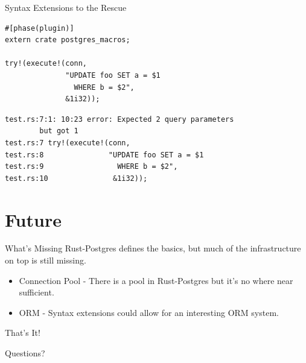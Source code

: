 \documentclass{beamer}
\begin{document}
\begin{frame}[fragile]{Syntax Extensions to the Rescue}
    \begin{verbatim}
#[phase(plugin)]
extern crate postgres_macros;

try!(execute!(conn,
              "UPDATE foo SET a = $1
                WHERE b = $2",
              &1i32));
    \end{verbatim}
    \begin{verbatim}
test.rs:7:1: 10:23 error: Expected 2 query parameters
        but got 1
test.rs:7 try!(execute!(conn,
test.rs:8               "UPDATE foo SET a = $1
test.rs:9                 WHERE b = $2",
test.rs:10               &1i32));
    \end{verbatim}
\end{frame}

\section{Future}

\begin{frame}{What's Missing}
    Rust-Postgres defines the basics, but much of the infrastructure on top
    is still missing.
    \begin{itemize}
        \item Connection Pool - There is a pool in Rust-Postgres but it's no
        where near sufficient.
        \item ORM - Syntax extensions could allow for an interesting ORM system.
    \end{itemize}
\end{frame}

\begin{frame}{That's It!}
    \begin{center}
        Questions?
    \end{center}
\end{frame}
\end{document}
